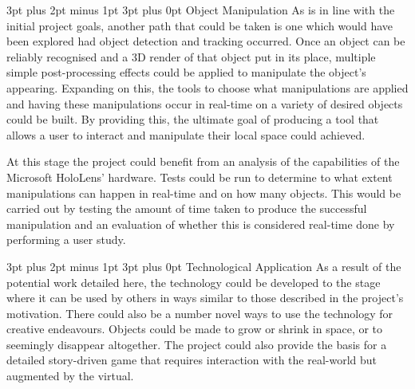 \documentclass[12pt,a4paper,oneside]{article}
\makeatletter
\renewcommand\subsubsection{\@startsection {subsubsection}{1}{0mm} %
	                           {3pt plus 2pt minus 1pt} %
	                           {3pt plus 0pt} %
	                           {\normalfont\bfseries}}
\makeatother
\begin{document}
\subsubsection{Object Manipulation}
As is in line with the initial project goals, another path that could be taken is one which would have been explored had object detection and tracking occurred. Once an object can be reliably recognised and a 3D render of that object put in its place, multiple simple post-processing effects could be applied to manipulate the object's appearing. Expanding on this, the tools to choose what manipulations are applied and having these manipulations occur in real-time on a variety of desired objects could be built. By providing this, the ultimate goal of producing a tool that allows a user to interact and manipulate their local space could achieved.

At this stage the project could benefit from an analysis of the capabilities of the Microsoft HoloLens' hardware. Tests could be run to determine to what extent manipulations can happen in real-time and on how many objects. This would be carried out by testing the amount of time taken to produce the successful manipulation and an evaluation of whether this is considered real-time done by performing a user study.

\subsubsection{Technological Application}
As a result of the potential work detailed here, the technology could be developed to the stage where it can be used by others in ways similar to those described in the project's motivation. There could also be a number novel ways to use the technology for creative endeavours. Objects could be made to grow or shrink in space, or to seemingly disappear altogether. The project could also provide the basis for a detailed story-driven game that requires interaction with the real-world but augmented by the virtual.

\newpage
\begin{singlespace}	


\end{singlespace}

\end{document}
